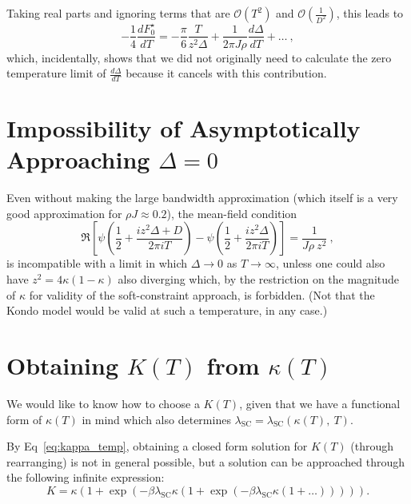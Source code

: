 Taking real parts and ignoring terms that are $ \mathcal{O} (T^2) $ and $ \mathcal{O} \left( \frac{1}{D^2} \right) $, this leads to
\begin{equation}
- \frac{1}{4} \frac{d F_{0}^{\star}}{dT} = - \frac{\pi}{6} \frac{T}{z^2 \Delta} + \frac{1}{2 \pi J \rho} \frac{d \Delta}{d T} + \ldots ~,
\end{equation}
which, incidentally, shows that we did not originally need to calculate the zero temperature limit of $ \frac{d \Delta}{d T} $ because it cancels with this contribution. 

\section{Impossibility of Asymptotically Approaching $ \Delta = 0 $}

Even without making the large bandwidth approximation (which itself is a very good approximation for $ \rho J \approx 0.2 $), the mean-field condition
\begin{equation}
\Re{\left[ \psi \left( \frac{1}{2} + \frac{i z^2 \Delta + D}{2 \pi i T} \right) - \psi \left( \frac{1}{2} + \frac{i z^2 \Delta}{2 \pi i T} \right) \right] = \frac{1}{J \rho ~ z^2}} ~ ,
\end{equation}
is incompatible with a limit in which $ \Delta \rightarrow 0 $ as $ T \rightarrow \infty $, unless one could also have $ z^2 = 4 \kappa (1 - \kappa) $ also diverging which, by the restriction on the magnitude of $ \kappa $ for validity of the soft-constraint approach, is forbidden. (Not that the Kondo model would be valid at such a temperature, in any case.)


\section{Obtaining $ K(T) $ from $ \kappa(T) $}
\label{sec:kappa_K_relation}

We would like to know how to choose a $ K(T) $, given that we have a functional form of $ \kappa(T) $ in mind which also determines $ \lambda_{\text{SC}} = \lambda_{\text{SC}}\left( \kappa(T),~ T\right)$.

By Eq~\eqref{eq:kappa_temp}, obtaining a closed form solution for $ K(T) $ (through rearranging) is not in general possible, but a solution can be approached through the following infinite expression:
\begin{equation}
K = \kappa  \left( 1 + \exp{\left( - \beta \lambda_{\text{SC}} \kappa \left( 1 + \exp{\left( - \beta \lambda_{\text{SC}} \kappa \left( 1 + \ldots \right) \right)} \right) \right)} \right).
\end{equation}

